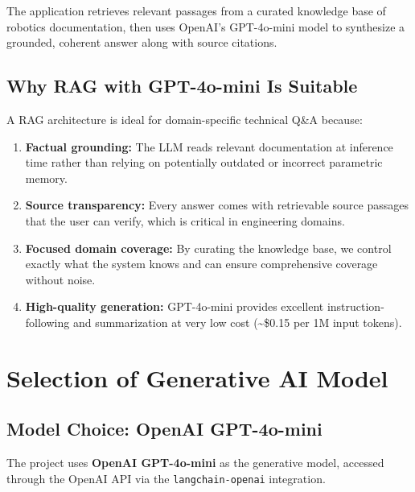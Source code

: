 \documentclass[12pt, a4paper]{article}
\begin{document}
The application retrieves relevant passages from a curated knowledge base of robotics documentation, then uses OpenAI's GPT-4o-mini model to synthesize a grounded, coherent answer along with source citations.

\subsection{Why RAG with GPT-4o-mini Is Suitable}

A RAG architecture is ideal for domain-specific technical Q\&A because:

\begin{enumerate}[nosep]
    \item \textbf{Factual grounding:} The LLM reads relevant documentation at inference time rather than relying on potentially outdated or incorrect parametric memory.
    \item \textbf{Source transparency:} Every answer comes with retrievable source passages that the user can verify, which is critical in engineering domains.
    \item \textbf{Focused domain coverage:} By curating the knowledge base, we control exactly what the system knows and can ensure comprehensive coverage without noise.
    \item \textbf{High-quality generation:} GPT-4o-mini provides excellent instruction-following and summarization at very low cost (\textasciitilde\$0.15 per 1M input tokens).
\end{enumerate}


\section{Selection of Generative AI Model}

\subsection{Model Choice: OpenAI GPT-4o-mini}

The project uses \textbf{OpenAI GPT-4o-mini} as the generative model, accessed through the OpenAI API via the \texttt{langchain-openai} integration.
\end{document}
